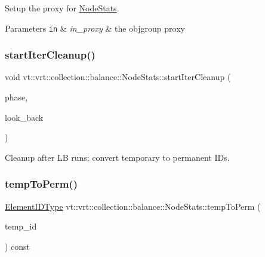Setup the proxy for {\ttfamily \hyperlink{structvt_1_1vrt_1_1collection_1_1balance_1_1_node_stats}{Node\+Stats}}. 


\begin{DoxyParams}[1]{Parameters}
\mbox{\tt in}  & {\em in\+\_\+proxy} & the objgroup proxy \\
\hline
\end{DoxyParams}
\mbox{\label{structvt_1_1vrt_1_1collection_1_1balance_1_1_node_stats_a733842a0c3cfcf96ba801fdd24866433}} 
\subsubsection{\texorpdfstring{start\+Iter\+Cleanup()}{startIterCleanup()}}
{\footnotesize\ttfamily void vt\+::vrt\+::collection\+::balance\+::\+Node\+Stats\+::start\+Iter\+Cleanup (\begin{DoxyParamCaption}\item[{\hyperlink{namespacevt_a46ce6733d5cdbd735d561b7b4029f6d7}{Phase\+Type}}]{phase,  }\item[{int}]{look\+\_\+back }\end{DoxyParamCaption})}



Cleanup after LB runs; convert temporary to permanent I\+Ds. 

\mbox{\label{structvt_1_1vrt_1_1collection_1_1balance_1_1_node_stats_a259d49b9aa4759b9d94be3e093fa2e6b}} 
\subsubsection{\texorpdfstring{temp\+To\+Perm()}{tempToPerm()}}
{\footnotesize\ttfamily \hyperlink{namespacevt_1_1vrt_1_1collection_1_1balance_a14c8d2c972f2913aa3f1636e5be0a120}{Element\+I\+D\+Type} vt\+::vrt\+::collection\+::balance\+::\+Node\+Stats\+::temp\+To\+Perm (\begin{DoxyParamCaption}\item[{\hyperlink{namespacevt_1_1vrt_1_1collection_1_1balance_a14c8d2c972f2913aa3f1636e5be0a120}{Element\+I\+D\+Type}}]{temp\+\_\+id }\end{DoxyParamCaption}) const}



